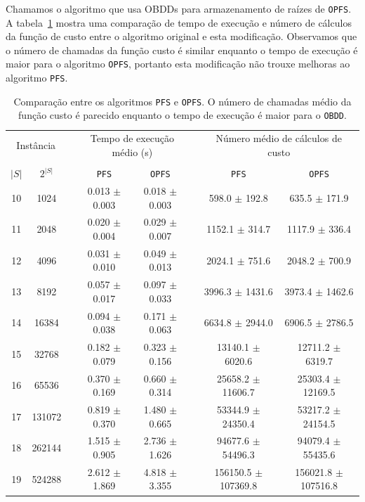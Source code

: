 \documentclass[12pt]{article}
\newcommand{\algname}[1]{\texttt{#1}}
\begin{document}
Chamamos o algoritmo que usa OBDDs para armazenamento de raízes de 
\algname{OPFS}. A tabela~\ref{tab:opfs_vs_pfs} mostra uma comparação de
tempo de execução e número de cálculos da função de custo entre o 
algoritmo original e esta modificação. Observamos que o número de 
chamadas da função custo é similar enquanto o tempo de execução é maior
para o algoritmo \algname{OPFS}, portanto esta modificação não trouxe 
melhoras ao algoritmo \algname{PFS}.

\begin{table}
\centering
\footnotesize
\caption{Comparação entre os algoritmos \algname{PFS} e \algname{OPFS}. 
O número de chamadas médio da função custo é parecido enquanto o tempo
de execução é maior para o \algname{OBDD}.}
\label{tab:opfs_vs_pfs}
\begin{tabular}{cc c cc c cc}
\toprule
\multicolumn{2}{c}{Instância} & \phantom{} & \multicolumn{2}{c}{Tempo de execução médio (s)}  & \phantom{} & \multicolumn{2}{c}{Número médio de cálculos de custo}\\
\cline{1-2}\cline{4-5}\cline{7-8}\\
$|S|$ & $2^{|S|}$ && \algname{PFS} & \algname{OPFS} && \algname{PFS} & \algname{OPFS} \\
10 &    1024 &&  0.013 $\pm$ 0.003 & 0.018 $\pm$ 0.003 &&  598.0 $\pm$ 192.8 & 635.5 $\pm$ 171.9 \\
11 &    2048 &&  0.020 $\pm$ 0.004 & 0.029 $\pm$ 0.007 &&  1152.1 $\pm$ 314.7 & 1117.9 $\pm$ 336.4 \\
12 &    4096 &&  0.031 $\pm$ 0.010 & 0.049 $\pm$ 0.013 &&  2024.1 $\pm$ 751.6 & 2048.2 $\pm$ 700.9 \\
13 &    8192 &&  0.057 $\pm$ 0.017 & 0.097 $\pm$ 0.033 &&  3996.3 $\pm$ 1431.6 & 3973.4 $\pm$ 1462.6 \\
14 &   16384 &&  0.094 $\pm$ 0.038 & 0.171 $\pm$ 0.063 &&  6634.8 $\pm$ 2944.0 & 6906.5 $\pm$ 2786.5 \\
15 &   32768 &&  0.182 $\pm$ 0.079 & 0.323 $\pm$ 0.156 &&  13140.1 $\pm$ 6020.6 & 12711.2 $\pm$ 6319.7 \\
16 &   65536 &&  0.370 $\pm$ 0.169 & 0.660 $\pm$ 0.314 &&  25658.2 $\pm$ 11606.7 & 25303.4 $\pm$ 12169.5 \\
17 &  131072 &&  0.819 $\pm$ 0.370 & 1.480 $\pm$ 0.665 &&  53344.9 $\pm$ 24350.4 & 53217.2 $\pm$ 24154.5 \\
18 &  262144 &&  1.515 $\pm$ 0.905 & 2.736 $\pm$ 1.626 &&  94677.6 $\pm$ 54496.3 & 94079.4 $\pm$ 55435.6 \\
19 &  524288 &&  2.612 $\pm$ 1.869 & 4.818 $\pm$ 3.355 &&  156150.5 $\pm$ 107369.8 & 156021.8 $\pm$ 107516.8 \\

\end{tabular}
\end{table}
\end{document}
